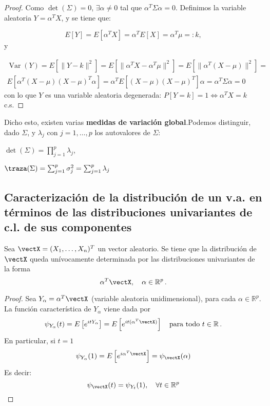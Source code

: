   \begin{proof}
    Como $\det(\Sigma) = 0$, $\exists \alpha \ne 0$ tal que $\alpha^T \Sigma \alpha = 0$. Definimos la variable aleatoria $Y = \alpha^T X$, y se tiene que:
    
    \[
      E[Y] = E[\alpha^T X] = \alpha^T E[X] = \alpha^T \mu =: k
    ,\] y
    
     \[
        \begin{split}
          \operatorname{Var}(Y) = E\left[\|Y-k\|^2\right] = E\left[\|\alpha^TX - \alpha^T \mu\|^2\right] = E\left[\|\alpha^T(X-\mu)\|^2\right] =\\
          E\left[\alpha^T(X-\mu)(X-\mu)^T\alpha\right]= \alpha^T E\left[(X-\mu)(X-\mu)^T\right]\alpha = \alpha^T \Sigma \alpha = 0
        \end{split}  
     \]
      con lo que $Y$ es una variable aleatoria degenerada: $P[Y = k] = 1 \iff \alpha^T X = k$ c.s.
  \end{proof}

Dicho esto, existen varias \textbf{medidas de variación global}.Podemos distinguir, dado $\Sigma$, y $\lambda_j$ con $j = 1,\dots,p$ los autovalores de $\Sigma$:
\begin{nlist}
\item $\det(\Sigma) =  \prod_{j=1}^p \lambda_j$,
  \item $\traza(\Sigma) = \sum_{j = 1}^p \sigma_j^2 = \sum_{j=1}^p \lambda_j$
\end{nlist}


\subsection{Caracterización de la distribución de un v.a. en términos de las distribuciones univariantes de c.l. de sus componentes}

\begin{nth}
  Sea $\vectX = (X_1,\dots, X_n)^T$ un vector aleatorio. Se tiene que la distribución de $\vectX$ queda unívocamente determinada por las distribuciones univariantes de la forma
  \[
\alpha ^T \vectX, \quad \alpha \in \mathbb R ^p\,.
  \]
\end{nth}
\begin{proof}
  Sea $Y_\alpha = \alpha^T \vectX$ (variable aleatoria unidimensional), para cada $\alpha \in \mathbb R^p$. La función característica de $Y_\alpha$ viene dada por
  \[
  \psi_{Y_\alpha}(t) = E\left[e^{itY_\alpha}\right] = E \left[e^{it(\alpha^T \vectX)}\right] \quad \text{para todo } t \in \mathbb R\,.
  \]
  En particular, si $t=1$
  \[
  \psi_{Y_\alpha}(1) = E\left[e^{i\alpha^T \vectX}\right] = \psi_{\vectX} (\alpha)
  \]
  Es decir:
  \[
  \psi_{\vectX}(t) = \psi_{Y_t}(1), \quad \forall t \in \mathbb R ^p
  \]
\end{proof}

